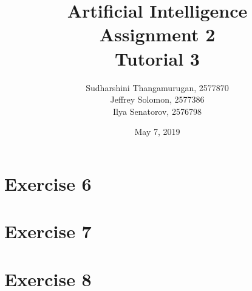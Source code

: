 \documentclass{article}
\title{Artificial Intelligence \\ Assignment 2 \\ Tutorial 3}
\author{Sudharshini Thangamurugan, 2577870 \\ Jeffrey Solomon, 2577386 \\ Ilya Senatorov, 2576798}
\date{May 7, 2019}
\begin{document}
    \maketitle
    \section*{Exercise 6}
    \section*{Exercise 7}
    \section*{Exercise 8}
\end{document}
